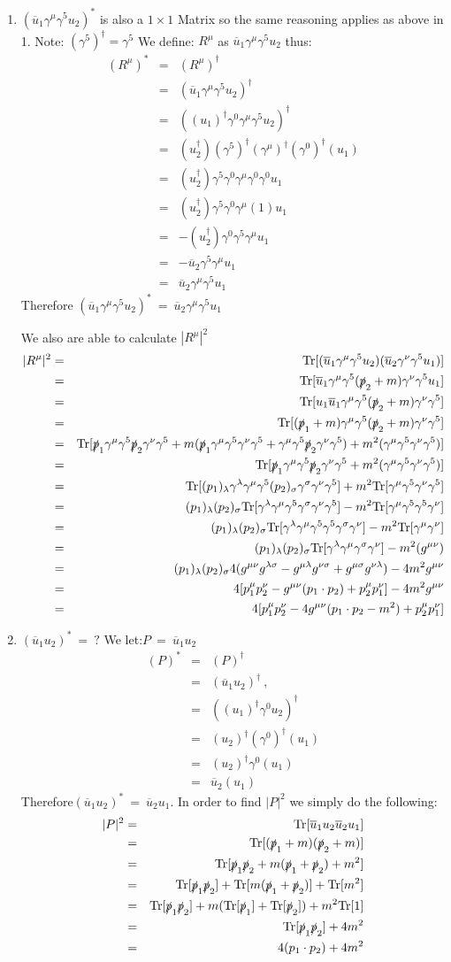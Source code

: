 \documentclass[12pt]{article}
\def \bea{\begin{eqnarray}}
\def \eea{\end{eqnarray}}
\def \Tr{{\rm Tr}}
\def \nn{\nonumber}
\def \nl{\nn \\}
\def \ou{\overline{u}}
\def \ga{\gamma}
\def \la{\lambda}
\def \si{\sigma}
\begin{document}
\begin{enumerate}
\item $(\ou_1\ga^\mu \ga^5 u_2)^*$ is also a $1\times1$ Matrix so the same reasoning applies as above in 1. Note: $(\ga^5)^\dag = \ga^5$
We define: $R^\mu$ as $\ou_1\ga^\mu\ga^5 u_2$ thus:
\bea
(R^\mu)^* &=& (R^\mu)^\dag \nl
&=&(\ou_1\ga^\mu\ga^5 u_2)^\dag \nl
&=& ((u_1)^\dag\ga^0\ga^\mu\ga^5 u_2)^\dag \nl
&=& (u_2^\dag)(\ga^5)^\dag(\ga^\mu)^\dag(\ga^0)^\dag(u_1) \nl
&=& (u_2^\dag)\ga^5\ga^0\ga^\mu\ga^0\ga^0 u_1 \nl
&=& (u_2^\dag)\ga^5\ga^0\ga^\mu(1) u_1 \nl
&=& -(u_2^\dag)\ga^0\ga^5\ga^\mu u_1 \nl
&=& -\ou_2\ga^5\ga^\mu u_1 \nl
&=& \ou_2\ga^\mu\ga^5 u_1
\eea
%
Therefore $(\ou_1\ga^\mu \ga^5 u_2)^*~=~\ou_2 \ga^\mu \ga^5 u_1$

We also are able to calculate $|R^\mu|^2$
\bea
|R^{\mu}|^2 &=& \Tr[(\ou_1\ga^\mu \ga^5 u_2)(\ou_2 \ga^\nu \ga^5 u_1)] \nl
&=& \Tr[\ou_1\ga^\mu \ga^5 (\slashed{p}_2+m) \ga^\nu \ga^5 u_1]  \nl
&=&\Tr[u_1\ou_1\ga^\mu \ga^5 (\slashed{p}_2+m) \ga^\nu \ga^5 ]\nl
&=&\Tr[(\slashed{p}_1+m)\ga^\mu \ga^5 (\slashed{p}_2+m) \ga^\nu \ga^5 ]\nl
&=& \Tr[\slashed{p}_1\ga^\mu\ga^5 \slashed{p}_2\ga^\nu \ga^5 + m( \slashed{p}_1\ga^\mu\ga^5\ga^\nu \ga^5 +\ga^\mu\ga^5 \slashed{p}_2\ga^\nu \ga^5) + m^2(\ga^\mu\ga^5\ga^\nu \ga^5)] \nl
&=&\Tr[\slashed{p}_1\ga^\mu\ga^5 \slashed{p}_2\ga^\nu \ga^5 + m^2(\ga^\mu\ga^5\ga^\nu \ga^5)] \nl
&=& \Tr[(p_1)_\la\ga^\la\ga^\mu\ga^5 (p_2)_\si\ga^\si\ga^\nu \ga^5] + m^2\Tr[\ga^\mu\ga^5\ga^\nu \ga^5]\nl
&=& (p_1)_\la(p_2)_\si \Tr[\ga^\la\ga^\mu\ga^5 \ga^\si\ga^\nu \ga^5] - m^2\Tr[\ga^\mu\ga^5\ga^5 \ga^\nu]\nl
&=& (p_1)_\la(p_2)_\si \Tr[\ga^\la\ga^\mu\ga^5\ga^5 \ga^\si\ga^\nu] - m^2\Tr[\ga^\mu\ga^\nu]\nl
&=& (p_1)_\la(p_2)_\si \Tr[\ga^\la\ga^\mu\ga^\si\ga^\nu] - m^2(g^{\mu\nu})\nl
&=& (p_1)_\la(p_2)_\si 4(g^{\mu\nu}g^{\la\si} - g^{\mu\la} g^{\nu\si} + g^{\mu\si}g^{\nu\la}) - 4m^2g^{\mu\nu}\nl
&=& 4[p_1^\mu p_2^\nu - g^{\mu\nu}(p_1 \cdot p_2) + p_2^\mu p_1^\nu] - 4m^2g^{\mu\nu} \nl
&=& 4[p_1^\mu p_2^\nu - 4g^{\mu\nu}(p_1 \cdot p_2 - m^2) + p_2^\mu p_1^\nu]
\eea

\item $ (\ou_1 u_2)^* ~=~ ?$
We let:$P ~=~ \ou_1 u_2$
\bea
(P)^* &=& (P)^\dag \nl
&=& (\ou_1 u_2)^\dag ~,~~ \nl
&=& ((u_1)^\dag\ga^0 u_2)^\dag \nl
&=& (u_2)^\dag(\ga^0)^\dag(u_1)\nl
&=& (u_2)^\dag\ga^0(u_1)\nl
&=& \ou_2(u_1)
\eea
Therefore$(\ou_1 u_2)^* ~=~ \ou_2 u_1$.
In order to find $|P|^2$ we simply do the following:
\bea
|P|^2&=& \Tr[\ou_1 u_2 \ou_2 u_1]  \\
&=& \Tr[(\slashed{p}_1+m)(\slashed{p}_2+m)] \nl
&=& \Tr[\slashed{p}_1\slashed{p}_2+m(\slashed{p}_1+\slashed{p}_2)+m^2]\nl
&=& \Tr[\slashed{p}_1\slashed{p}_2]+\Tr[m(\slashed{p}_1+\slashed{p}_2)]+\Tr[m^2] \nl
&=& \Tr[\slashed{p}_1\slashed{p}_2]+m(\Tr[\slashed{p}_1]+\Tr[\slashed{p}_2])+m^2\Tr[1] \nl
&=& \Tr[\slashed{p}_1\slashed{p}_2]+4m^2 \nl
&=& 4(p_1 \cdot p_2)+4m^2
\eea


\end{enumerate}
\end{document}
